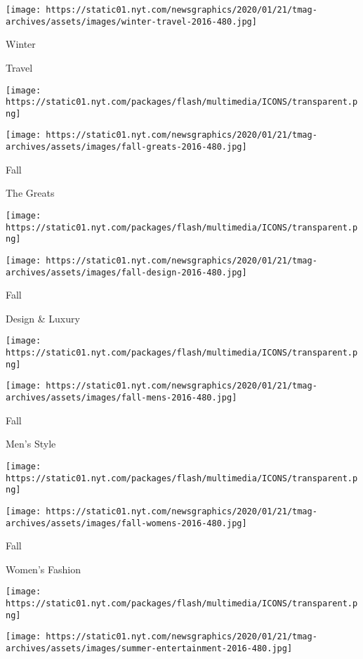 \texttt{[image: https://static01.nyt.com/newsgraphics/2020/01/21/tmag-archives/assets/images/winter-travel-2016-480.jpg]}

Winter

Travel

\href{https://www.nytimes.com/issue/t-magazine/2016/10/23/greats}{}

\texttt{[image: https://static01.nyt.com/packages/flash/multimedia/ICONS/transparent.png]}

\texttt{[image: https://static01.nyt.com/newsgraphics/2020/01/21/tmag-archives/assets/images/fall-greats-2016-480.jpg]}

Fall

The Greats

\href{https://www.nytimes.com/issue/t-magazine/2016/09/25/design-luxury}{}

\texttt{[image: https://static01.nyt.com/packages/flash/multimedia/ICONS/transparent.png]}

\texttt{[image: https://static01.nyt.com/newsgraphics/2020/01/21/tmag-archives/assets/images/fall-design-2016-480.jpg]}

Fall

Design \& Luxury

\href{https://www.nytimes.com/issue/t-magazine/2016/09/11/mens-style}{}

\texttt{[image: https://static01.nyt.com/packages/flash/multimedia/ICONS/transparent.png]}

\texttt{[image: https://static01.nyt.com/newsgraphics/2020/01/21/tmag-archives/assets/images/fall-mens-2016-480.jpg]}

Fall

Men's Style

\href{https://www.nytimes.com/issue/t-magazine/2016/08/21/womens-fashion}{}

\texttt{[image: https://static01.nyt.com/packages/flash/multimedia/ICONS/transparent.png]}

\texttt{[image: https://static01.nyt.com/newsgraphics/2020/01/21/tmag-archives/assets/images/fall-womens-2016-480.jpg]}

Fall

Women's Fashion

\href{https://www.nytimes.com/issue/t-magazine/2016/07/17/entertainment}{}

\texttt{[image: https://static01.nyt.com/packages/flash/multimedia/ICONS/transparent.png]}

\texttt{[image: https://static01.nyt.com/newsgraphics/2020/01/21/tmag-archives/assets/images/summer-entertainment-2016-480.jpg]}

